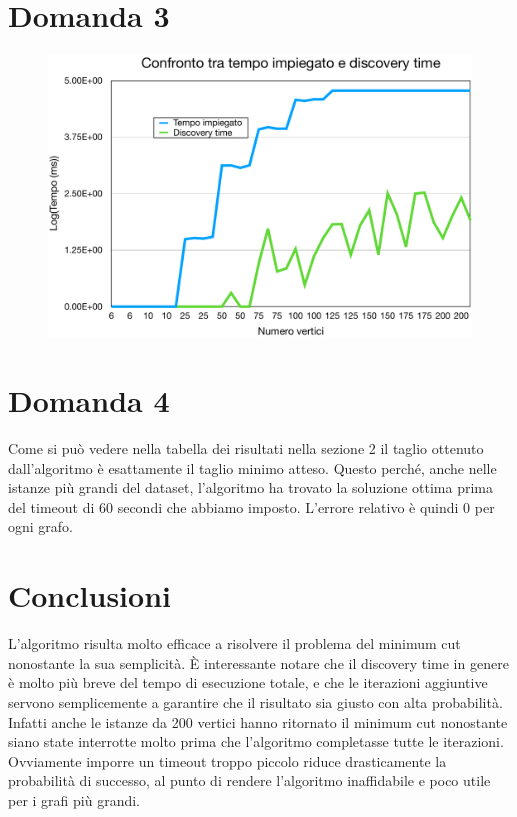 \documentclass[a4paper]{article}
\begin{document}
\section{Domanda 3}
\begin{figure}[H]
	\begin{center}
	\includegraphics[width=17cm]{discoveryvsfulltime}
	\label{fig:discoveryvsfulltime}
\end{center}
\end{figure}

\section{Domanda 4}
Come si può vedere nella tabella dei risultati nella sezione 2 il taglio ottenuto dall'algoritmo è esattamente il taglio minimo atteso. Questo perché, anche nelle istanze più grandi del dataset, l'algoritmo ha trovato la soluzione ottima prima del timeout di 60 secondi che abbiamo imposto. L'errore relativo è quindi 0 per ogni grafo.

\section{Conclusioni}
L'algoritmo risulta molto efficace a risolvere il problema del minimum cut nonostante la sua semplicità. È interessante notare che il discovery time in genere è molto più breve del tempo di esecuzione totale, e che le iterazioni aggiuntive servono semplicemente a garantire che il risultato sia giusto con alta probabilità. Infatti anche le istanze da 200 vertici hanno ritornato il minimum cut nonostante siano state interrotte molto prima che l'algoritmo completasse tutte le iterazioni. Ovviamente imporre un timeout troppo piccolo riduce drasticamente la probabilità di successo, al punto di rendere l'algoritmo inaffidabile e poco utile per i grafi più grandi.
\end{document}
